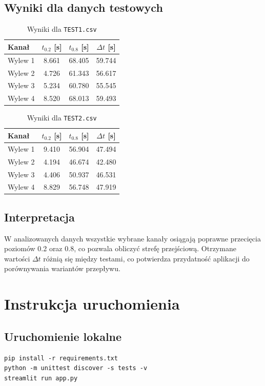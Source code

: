 \documentclass[12pt,a4paper]{article}
\begin{document}
\subsection{Wyniki dla danych testowych}
\begin{table}[H]
    \centering
    \caption{Wyniki dla \texttt{TEST1.csv}}
    \begin{tabular}{lccc}
        \toprule
        Kanał & \(t_{0.2}\) [s] & \(t_{0.8}\) [s] & \(\Delta t\) [s] \\
        \midrule
        Wylew 1 & 8.661 & 68.405 & 59.744 \\
        Wylew 2 & 4.726 & 61.343 & 56.617 \\
        Wylew 3 & 5.234 & 60.780 & 55.545 \\
        Wylew 4 & 8.520 & 68.013 & 59.493 \\
        \bottomrule
    \end{tabular}
\end{table}

\begin{table}[H]
    \centering
    \caption{Wyniki dla \texttt{TEST2.csv}}
    \begin{tabular}{lccc}
        \toprule
        Kanał & \(t_{0.2}\) [s] & \(t_{0.8}\) [s] & \(\Delta t\) [s] \\
        \midrule
        Wylew 1 & 9.410 & 56.904 & 47.494 \\
        Wylew 2 & 4.194 & 46.674 & 42.480 \\
        Wylew 3 & 4.406 & 50.937 & 46.531 \\
        Wylew 4 & 8.829 & 56.748 & 47.919 \\
        \bottomrule
    \end{tabular}
\end{table}

\subsection{Interpretacja}
W analizowanych danych wszystkie wybrane kanały osiągają poprawne przecięcia poziomów 0.2 oraz 0.8, co pozwala obliczyć strefę przejściową. Otrzymane wartości \(\Delta t\) różnią się między testami, co potwierdza przydatność aplikacji do porównywania wariantów przepływu.

\section{Instrukcja uruchomienia}
\subsection{Uruchomienie lokalne}
\begin{verbatim}
pip install -r requirements.txt
python -m unittest discover -s tests -v
streamlit run app.py
\end{verbatim}
\end{document}
